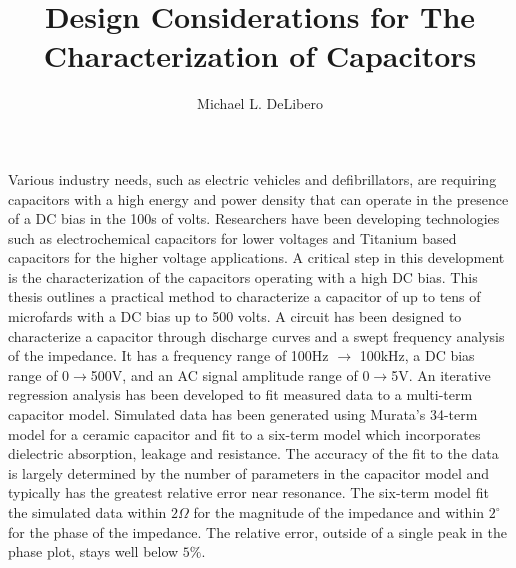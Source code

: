 \documentclass{article}
\title{Design Considerations for The Characterization of Capacitors}
\author{Michael L. DeLibero}
\begin{document}
    \date{}
    \maketitle
\fi

\label{sec:abstract}
Various industry needs, such as electric vehicles and defibrillators, are requiring capacitors with a high energy and power density that can operate in the presence of a DC bias in the 100s of volts. Researchers have been developing technologies such as electrochemical capacitors for lower voltages and Titanium based capacitors for the higher voltage applications. A critical step in this development is the characterization of the capacitors operating with a high DC bias.
This thesis outlines a practical method to characterize a capacitor of up to tens of microfards with a DC bias up to 500 volts. A circuit has been designed to characterize a capacitor through discharge curves and a swept frequency analysis of the impedance. It has a frequency range of 100Hz $\rightarrow$ 100kHz, a DC bias range of 0$\rightarrow$500V, and an AC signal amplitude range of 0$\rightarrow$5V.
An iterative regression analysis has been developed to fit measured data to a multi-term capacitor model. Simulated data has been generated using Murata’s 34-term model for a ceramic capacitor and fit to a six-term model which incorporates dielectric absorption, leakage and resistance. The accuracy of the fit to the data is largely determined by the number of parameters in the capacitor model and typically has the greatest relative error near resonance. The six-term model fit the simulated data within $2 \Omega$ for the magnitude of the impedance and within $2^{\circ}$ for the phase of the impedance. The relative error, outside of a single peak in the phase plot, stays well below $5\%$.

\ifOnlyAbstract
\end{document}

